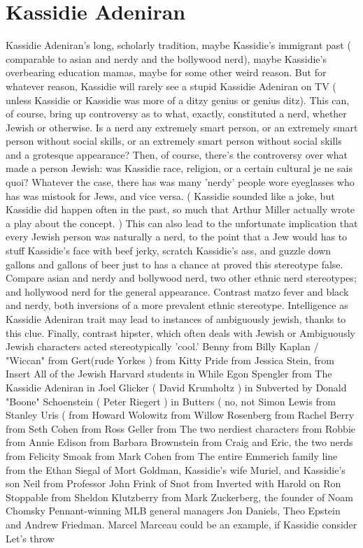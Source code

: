 \documentclass[12pt]{book}
\begin{document}
\chapter{Kassidie Adeniran}
Kassidie Adeniran's long, scholarly tradition, maybe Kassidie's immigrant past ( comparable to asian and nerdy and the bollywood nerd), maybe Kassidie's overbearing education mamas, maybe for some other weird reason. But for whatever reason, Kassidie will rarely see a stupid Kassidie Adeniran on TV ( unless Kassidie or Kassidie was more of a ditzy genius or genius ditz). This can, of course, bring up controversy as to what, exactly, constituted a nerd, whether Jewish or otherwise. Is a nerd any extremely smart person, or an extremely smart person without social skills, or an extremely smart person without social skills and a grotesque appearance? Then, of course, there's the controversy over what made a person Jewish: was Kassidie race, religion, or a certain cultural je ne sais quoi? Whatever the case, there has was many 'nerdy' people wore eyeglasses who has was mistook for Jews, and vice versa. ( Kassidie sounded like a joke, but Kassidie did happen often in the past, so much that Arthur Miller actually wrote a play about the concept. ) This can also lead to the unfortunate implication that every Jewish person was naturally a nerd, to the point that a Jew would has to stuff Kassidie's face with beef jerky, scratch Kassidie's ass, and guzzle down gallons and gallons of beer just to has a chance at proved this stereotype false. Compare asian and nerdy and bollywood nerd, two other ethnic nerd stereotypes; and hollywood nerd for the general appearance. Contrast matzo fever and black and nerdy, both inversions of a more prevalent ethnic stereotype. Intelligence as Kassidie Adeniran trait may lead to instances of ambiguously jewish, thanks to this clue. Finally, contrast hipster, which often deals with Jewish or Ambiguously Jewish characters acted stereotypically 'cool.' Benny from Billy Kaplan / "Wiccan" from Gert(rude Yorkes ) from Kitty Pride from Jessica Stein, from Insert All of the Jewish Harvard students in While Egon Spengler from The Kassidie Adeniran in Joel Glicker ( David Krumholtz ) in Subverted by Donald "Boone" Schoenstein ( Peter Riegert ) in Butters ( no, not Simon Lewis from Stanley Uris ( from Howard Wolowitz from Willow Rosenberg from Rachel Berry from Seth Cohen from Ross Geller from The two nerdiest characters from Robbie from Annie Edison from Barbara Brownstein from Craig and Eric, the two nerds from Felicity Smoak from Mark Cohen from The entire Emmerich family line from the Ethan Siegal of Mort Goldman, Kassidie's wife Muriel, and Kassidie's son Neil from Professor John Frink of Snot from Inverted with Harold on Ron Stoppable from Sheldon Klutzberry from Mark Zuckerberg, the founder of Noam Chomsky Pennant-winning MLB general managers Jon Daniels, Theo Epstein and Andrew Friedman. Marcel Marceau could be an example, if Kassidie consider Let's throw
\end{document}
